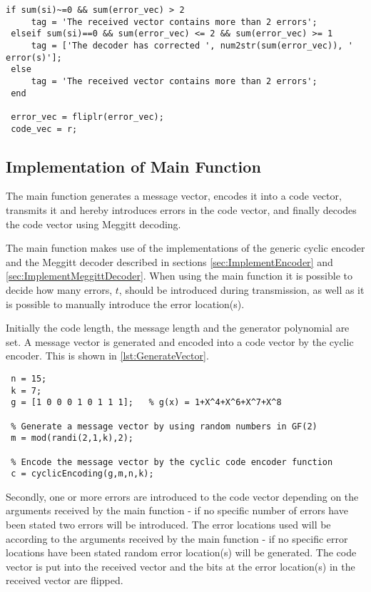 \documentclass[Main]{subfiles}
\begin{document}
\begin{lstlisting}[caption=Meggitt decode return, style=Code-Matlab, label=lst:DecodeReturn]
 if sum(si)~=0 && sum(error_vec) > 2
     tag = 'The received vector contains more than 2 errors';
 elseif sum(si)==0 && sum(error_vec) <= 2 && sum(error_vec) >= 1
     tag = ['The decoder has corrected ', num2str(sum(error_vec)), ' error(s)'];
 else
     tag = 'The received vector contains more than 2 errors';
 end
 
 error_vec = fliplr(error_vec);
 code_vec = r;
\end{lstlisting}

\subsection{Implementation of Main Function}
The main function generates a message vector, encodes it into a code vector, transmits it and hereby introduces errors in the code vector, and finally decodes the code vector using Meggitt decoding.

The main function makes use of the implementations of the generic cyclic encoder and the Meggitt decoder described in sections \ref{sec:ImplementEncoder} and \ref{sec:ImplementMeggittDecoder}. 
When using the main function it is possible to decide how many errors, $t$, should be introduced during transmission, as well as it is possible to manually introduce the error location(s).

Initially the code length, the message length and the generator polynomial are set. A message vector is generated and encoded into a code vector by the cyclic encoder. This is shown in \codeTitle \ref{lst:GenerateVector}. 

\begin{lstlisting}[caption=Generating and Encoding a Vector, style=Code-Matlab, label=lst:GenerateVector]
 % Set the code length, message length and the generator polynomial
 n = 15;
 k = 7;
 g = [1 0 0 0 1 0 1 1 1];   % g(x) = 1+X^4+X^6+X^7+X^8

 % Generate a message vector by using random numbers in GF(2)
 m = mod(randi(2,1,k),2);

 % Encode the message vector by the cyclic code encoder function
 c = cyclicEncoding(g,m,n,k);
\end{lstlisting}

Secondly, one or more errors are introduced to the code vector depending on the arguments received by the main function - if no specific number of errors have been stated two errors will be introduced. 
The error locations used will be according to the arguments received by the main function - if no specific error locations have been stated random error location(s) will be generated. 
The code vector is put into the received vector and the bits at the error location(s) in the received vector are flipped.
\end{document}
